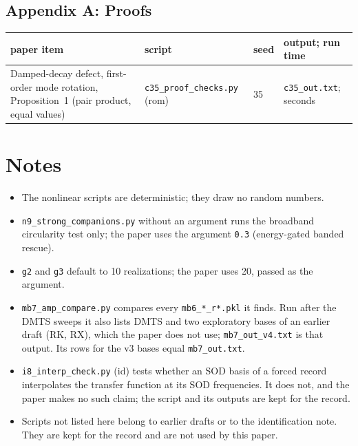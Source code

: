 \documentclass[10pt]{article}
\newcommand{\f}[1]{\texttt{#1}}
\begin{document}
\subsection*{Appendix A: Proofs}
\begin{longtable}{L{0.31\textwidth}L{0.25\textwidth}L{0.08\textwidth}L{0.25\textwidth}}
\toprule
paper item & script & seed & output; run time\\ \midrule
Damped-decay defect, first-order mode rotation, Proposition~1 (pair product, equal values) & \f{c35\_\allowbreak{}proof\_\allowbreak{}checks.py} (rom) & 35 & \f{c35\_\allowbreak{}out.txt}; seconds\\
\bottomrule
\end{longtable}

\section{Notes}
\begin{itemize}
\item The nonlinear scripts are deterministic; they draw no random numbers.
\item \f{n9\_\allowbreak{}strong\_\allowbreak{}companions.py} without an argument runs the broadband circularity test only; the paper uses the argument \f{0.3} (energy-gated banded rescue).
\item \f{g2} and \f{g3} default to 10 realizations; the paper uses 20, passed as the argument.
\item \f{mb7\_\allowbreak{}amp\_\allowbreak{}compare.py} compares every \f{mb6\_\allowbreak{}*\_\allowbreak{}r*.pkl} it finds. Run after the DMTS sweeps it also lists DMTS and two exploratory bases of an earlier draft (RK, RX), which the paper does not use; \f{mb7\_\allowbreak{}out\_\allowbreak{}v4.txt} is that output. Its rows for the v3 bases equal \f{mb7\_\allowbreak{}out.txt}.
\item \f{i8\_\allowbreak{}interp\_\allowbreak{}check.py} (id) tests whether an SOD basis of a forced record interpolates the transfer function at its SOD frequencies. It does not, and the paper makes no such claim; the script and its outputs are kept for the record.
\item Scripts not listed here belong to earlier drafts or to the identification note. They are kept for the record and are not used by this paper.
\end{itemize}
\end{document}
